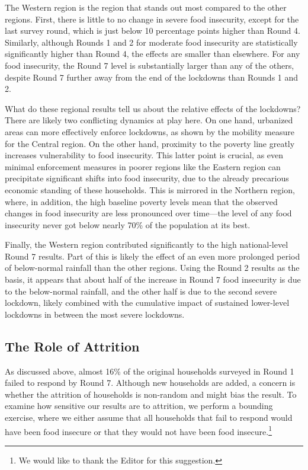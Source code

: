 \documentclass{wber}
\begin{document}
The Western region is the region that stands out most compared to the
other regions. First, there is little to no change in severe food
insecurity, except for the last survey round, which is just below 10
percentage points higher than Round 4. Similarly, although Rounds 1 and
2 for moderate food insecurity are statistically significantly higher
than Round 4, the effects are smaller than elsewhere. For any food
insecurity, the Round 7 level is substantially larger than any of the
others, despite Round 7 further away from the end of the lockdowns than
Rounds 1 and 2.

What do these regional results tell us about the relative effects of the
lockdowns? There are likely two conflicting dynamics at play here. On
one hand, urbanized areas can more effectively enforce lockdowns, as
shown by the mobility measure for the Central region. On the other hand,
proximity to the poverty line greatly increases vulnerability to food
insecurity. This latter point is crucial, as even minimal enforcement
measures in poorer regions like the Eastern region can precipitate
significant shifts into food insecurity, due to the already precarious
economic standing of these households. This is mirrored in the Northern
region, where, in addition, the high baseline poverty levels mean that
the observed changes in food insecurity are less pronounced over
time---the level of any food insecurity never got below nearly 70\% of
the population at its best.

Finally, the Western region contributed significantly to the high
national-level Round 7 results. Part of this is likely the effect of an
even more prolonged period of below-normal rainfall than the other
regions. Using the Round 2 results as the basis, it appears that about
half of the increase in Round 7 food insecurity is due to the
below-normal rainfall, and the other half is due to the second severe
lockdown, likely combined with the cumulative impact of sustained
lower-level lockdowns in between the most severe lockdowns.

\subsection{The Role of Attrition}\label{the-role-of-attrition}

As discussed above, almost 16\% of the original households surveyed in
Round 1 failed to respond by Round 7. Although new households are added,
a concern is whether the attrition of households is non-random and might
bias the result. To examine how sensitive our results are to attrition,
we perform a bounding exercise, where we either assume that all
households that fail to respond would have been food insecure or that
they would not have been food insecure.\footnote{We would like to thank
  the Editor for this suggestion.}
\end{document}
